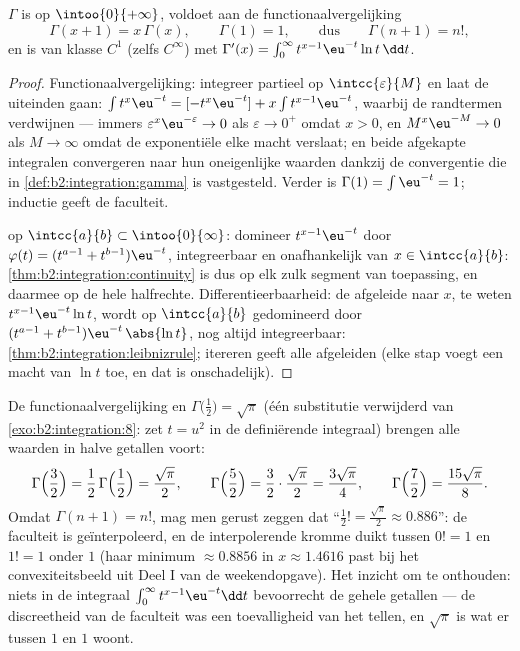 \begin{theorem}\label{thm:b2:integration:gammaprops}
$\Gamma$ is  op $\intoo{0}{+\infty}$, voldoet aan de
functionaalvergelijking
\[
\Gamma(x + 1) = x\,\Gamma(x),
\qquad \Gamma(1) = 1,
\qquad\text{dus}\qquad \Gamma(n + 1) = n! ,
\]
en is van klasse $C^1$ (zelfs $C^\infty$) met $\Gamma'(x) =
\int_0^\infty t^{x-1}\eu^{-t}\ln t\,\dd t$.
\end{theorem}

\begin{proof}
Functionaalvergelijking: integreer partieel op
$\intcc{\varepsilon}{M}$ en laat de uiteinden gaan: $\int
t^{x}\eu^{-t} = [-t^x\eu^{-t}] + x\int t^{x-1}\eu^{-t}$, waarbij de
randtermen verdwijnen --- immers $\varepsilon^x\eu^{-\varepsilon}
\to 0$ als $\varepsilon \to 0^+$ omdat $x > 0$, en $M^x\eu^{-M} \to
0$ als $M \to \infty$ omdat de exponentiële elke macht verslaat; en
beide afgekapte integralen convergeren naar hun oneigenlijke
waarden dankzij de convergentie die in
\cref{def:b2:integration:gamma} is vastgesteld. Verder is
$\Gamma(1) = \int \eu^{-t} = 1$; inductie geeft de faculteit.

 op $\intcc{a}{b} \subset \intoo{0}{\infty}$: domineer
$t^{x-1}\eu^{-t}$ door $\varphi(t) = (t^{a-1} + t^{b-1})\eu^{-t}$,
integreerbaar en onafhankelijk van $x \in \intcc{a}{b}$:
\cref{thm:b2:integration:continuity} is dus op elk zulk segment van
toepassing, en daarmee op de hele halfrechte.
Differentieerbaarheid: de afgeleide naar $x$, te weten
$t^{x-1}\eu^{-t}\ln t$, wordt op $\intcc{a}{b}$ gedomineerd door
$(t^{a-1} + t^{b-1})\eu^{-t}\,\abs{\ln t}$, nog altijd
integreerbaar: \cref{thm:b2:integration:leibnizrule}; itereren
geeft alle afgeleiden (elke stap voegt een macht van $\ln t$ toe,
en dat is onschadelijk).
\end{proof}

\begin{example}\label{ex:b2:integration:halffactorial}
De functionaalvergelijking en $\Gamma\bigl(\frac12\bigr) =
\sqrt\pi$ (één substitutie verwijderd van
\cref{exo:b2:integration:8}: zet $t = u^2$ in de definiërende
integraal) brengen alle waarden in halve getallen voort:
\[
\Gamma\Bigl(\frac32\Bigr) = \frac12\,\Gamma\Bigl(\frac12\Bigr)
= \frac{\sqrt\pi}{2},
\qquad
\Gamma\Bigl(\frac52\Bigr) = \frac32\cdot\frac{\sqrt\pi}{2}
= \frac{3\sqrt\pi}{4},
\qquad
\Gamma\Bigl(\frac72\Bigr) = \frac{15\sqrt\pi}{8} .
\]
Omdat $\Gamma(n+1) = n!$, mag men gerust zeggen dat ``$\frac12! =
\frac{\sqrt\pi}{2} \approx 0.886$'': de faculteit is
geïnterpoleerd, en de interpolerende kromme duikt tussen $0! = 1$
en $1! = 1$ onder $1$ (haar minimum $\approx 0.8856$ in $x \approx
1.4616$ past bij het convexiteitsbeeld uit Deel I van de
weekendopgave). Het inzicht om te onthouden: niets in de integraal
$\int_0^\infty t^{x-1}\eu^{-t}\dd t$ bevoorrecht de gehele getallen
--- de discreetheid van de faculteit was een toevalligheid van het
tellen, en $\sqrt\pi$ is wat er tussen $1$ en $1$ woont.
\end{example}

